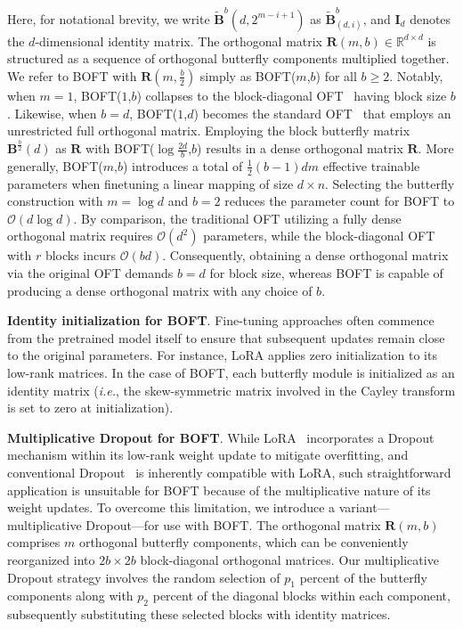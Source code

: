 Here, for notational brevity, we write $\tilde{\bm{B}}^b(d,2^{m - i+1})$ as $\tilde{\bm{B}}^b_{(d,i)}$, and $\bm{I}_d$ denotes the $d$-dimensional identity matrix. The orthogonal matrix $\bm{R}(m,b)\in\mathbb{R}^{d\times d}$ is structured as a sequence of orthogonal butterfly components multiplied together. We refer to BOFT with $\bm{R}(m,\frac{b}{2})$ simply as BOFT($m$,$b$) for all $b \geq 2$. Notably, when $m=1$, BOFT($1$,$b$) collapses to the block-diagonal OFT~\cite{qiu2023controlling} having block size $b$. Likewise, when $b=d$, BOFT($1$,$d$) becomes the standard OFT~\cite{qiu2023controlling} that employs an unrestricted full orthogonal matrix. Employing the block butterfly matrix $\bm{B}^{\frac{b}{2}}(d)$ as $\bm{R}$ with BOFT($\log \frac{2d}{b}$,$b$) results in a dense orthogonal matrix $\bm{R}$. More generally, BOFT($m$,$b$) introduces a total of $\frac{1}{2}(b-1)dm$ effective trainable parameters when finetuning a linear mapping of size $d\times n$. Selecting the butterfly construction with $m=\log d$ and $b=2$ reduces the parameter count for BOFT to $\mathcal{O}(d\log d)$. By comparison, the traditional OFT utilizing a fully dense orthogonal matrix requires $\mathcal{O}(d^2)$ parameters, while the block-diagonal OFT with $r$ blocks incurs $\mathcal{O}(bd)$. Consequently, obtaining a dense orthogonal matrix via the original OFT demands $b=d$ for block size, whereas BOFT is capable of producing a dense orthogonal matrix with any choice of $b$.

\textbf{Identity initialization for BOFT}. Fine-tuning approaches often commence from the pretrained model itself to ensure that subsequent updates remain close to the original parameters. For instance, LoRA applies zero initialization to its low-rank matrices. In the case of BOFT, each butterfly module is initialized as an identity matrix (\emph{i.e.}, the skew-symmetric matrix involved in the Cayley transform is set to zero at initialization).

\textbf{Multiplicative Dropout for BOFT}. While LoRA~\cite{hulora2022} incorporates a Dropout mechanism within its low-rank weight update to mitigate overfitting, and conventional Dropout~\cite{srivastava2014dropout} is inherently compatible with LoRA, such straightforward application is unsuitable for BOFT because of the multiplicative nature of its weight updates. To overcome this limitation, we introduce a variant—multiplicative Dropout—for use with BOFT. The orthogonal matrix $\bm{R}(m,b)$ comprises $m$ orthogonal butterfly components, which can be conveniently reorganized into $2b\times 2b$ block-diagonal orthogonal matrices. Our multiplicative Dropout strategy involves the random selection of $p_1$ percent of the butterfly components along with $p_2$ percent of the diagonal blocks within each component, subsequently substituting these selected blocks with identity matrices.

